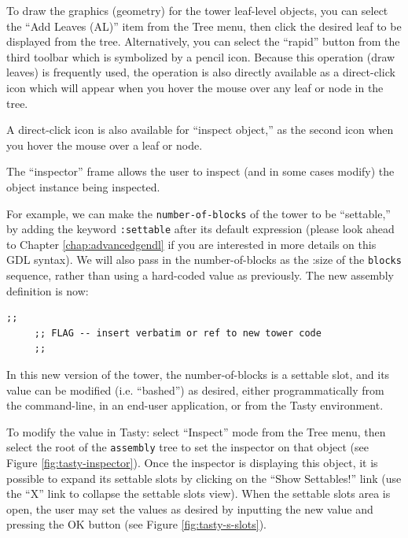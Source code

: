 \documentclass [11pt]{book}
\begin{document}
To draw the graphics (geometry) for the tower leaf-level
objects, you can select the ``Add Leaves (AL)'' item from the Tree
menu, then click the desired leaf to be displayed from the
tree. Alternatively, you can select the ``rapid'' button from the
third toolbar which is symbolized by a pencil icon. Because this
operation (draw leaves) is frequently used, the operation is also
directly available as a direct-click icon which will appear when you
hover the mouse over any leaf or node in the tree.



A direct-click icon is also available for ``inspect
object,'' as the second icon when you hover the mouse over a leaf or
node.



The ``inspector'' frame allows the user to inspect (and in
some cases modify) the object instance being inspected.



For example, we can make the \texttt{number-of-blocks} of the tower to be ``settable,'' by adding the keyword \texttt{:settable} after its default expression (please look ahead to Chapter 
\ref{chap:advancedgendl} if you are interested in more details on this GDL
syntax). We will also pass in the number-of-blocks as the :size of
the \texttt{blocks} sequence, rather than using a hard-coded value as
previously. The new assembly definition is now:

\begin{verbatim};;
	 ;; FLAG -- insert verbatim or ref to new tower code
	 ;; 
\end{verbatim}



In this new version of the tower, the number-of-blocks is a
settable slot, and its value can be modified (i.e. ``bashed'') as
desired, either programmatically from the command-line, in an end-user
application, or from the Tasty environment.



To modify the value in Tasty: select ``Inspect'' mode from the Tree
menu, then select the root of the \texttt{assembly} tree to set the inspector on that object (see Figure 
\ref{fig:tasty-inspector}). Once the inspector is displaying this object, it is
possible to expand its settable slots by clicking on the ``Show
Settables!''  link (use the ``X'' link to collapse the settable slots
view). When the settable slots area is open, the user may set the
values as desired by inputting the new value and pressing the OK
button (see Figure 
\ref{fig:tasty-s-slots}).
\end{document}
